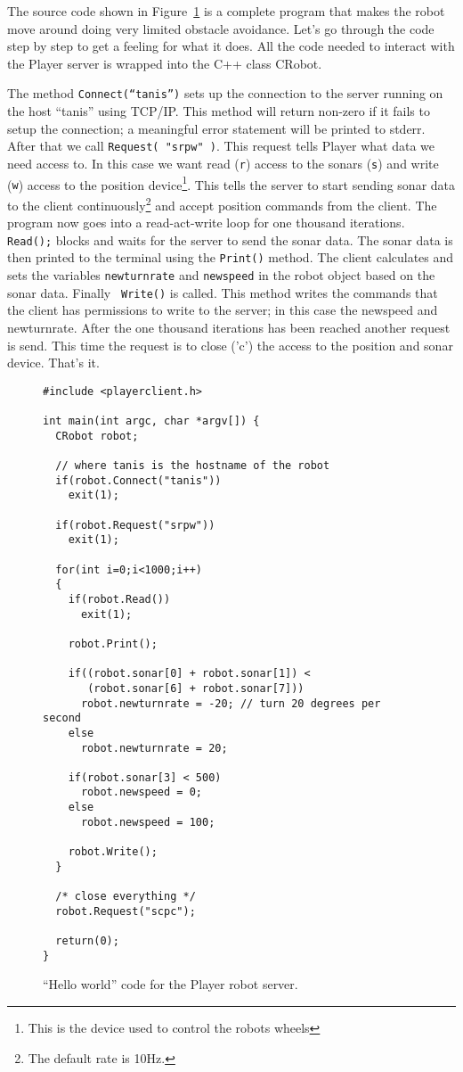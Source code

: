 \documentclass[11pt]{article}
\begin{document}
The source code shown in Figure~\ref{helloworld} is a complete
program that makes the robot move around doing very limited obstacle 
avoidance.
Let's go through the code step by step to get a feeling for what
it does. All the code needed to interact with the Player server is
wrapped into the C++ class CRobot. 

The method {\tt Connect(``tanis'')} sets up the connection to the server
running on the host ``tanis'' using TCP/IP. This method will
return non-zero if it fails to setup the connection; a meaningful
error statement will be printed to stderr.
After that we call {\tt Request( "srpw" )}.
This request tells Player what data we need access to. In this
case we want read ({\tt r}) access to the sonars ({\tt s}) and write ({\tt w})
access to the position device\footnote{This is the device used to 
control the robots wheels}. This tells the server to start sending
sonar data to the client continuously\footnote{The default rate is 
10Hz.} and accept position commands from the client. The program now
goes into a read-act-write loop for one thousand iterations. {\tt 
Read();} blocks and waits for the server to send
the sonar data.
The sonar data is then printed to the terminal using the {\tt Print()}
method. The client calculates and sets the variables {\tt newturnrate} and
{\tt newspeed} in the robot object based on the sonar data. Finally {\tt 
Write()} is called. This method writes the commands that the client has 
permissions to write to the server; in this case the newspeed and 
newturnrate. After the one thousand iterations has been reached another
request is send. This time the request is to close ('c') the access to
the position and sonar device. That's it.

\begin{figure}
\begin{verbatim}
#include <playerclient.h>

int main(int argc, char *argv[]) {
  CRobot robot;

  // where tanis is the hostname of the robot
  if(robot.Connect("tanis"))
    exit(1);

  if(robot.Request("srpw")) 
    exit(1); 

  for(int i=0;i<1000;i++) 
  {
    if(robot.Read())
      exit(1);

    robot.Print();

    if((robot.sonar[0] + robot.sonar[1]) < 
       (robot.sonar[6] + robot.sonar[7])) 
      robot.newturnrate = -20; // turn 20 degrees per second
    else
      robot.newturnrate = 20;
 
    if(robot.sonar[3] < 500) 
      robot.newspeed = 0;
    else 
      robot.newspeed = 100;
 
    robot.Write();
  }

  /* close everything */
  robot.Request("scpc");

  return(0);
}
\end{verbatim}

\caption{ ``Hello world'' code for the Player robot server.}
\label{helloworld}
\end{figure}
\end{document}
